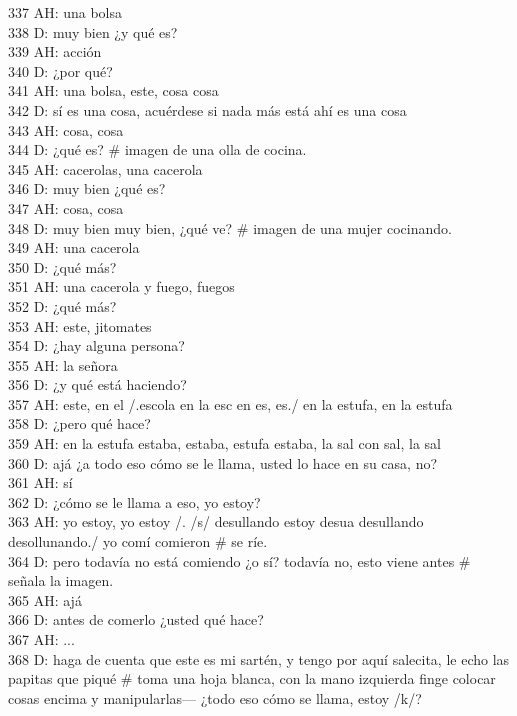 337 AH: una bolsa\\
338 D: muy bien ¿y qué es?\\
339 AH: acción\\
340 D: ¿por qué?\\
341 AH: una bolsa, este, cosa cosa\\
342 D: sí es una cosa, acuérdese si nada más está ahí es una cosa\\
343 AH: cosa, cosa\\
344 D: ¿qué es? \# imagen de una olla de cocina.\\
345 AH: cacerolas, una cacerola\\
346 D: muy bien ¿qué es?\\
347 AH: cosa, cosa\\
348 D: muy bien muy bien, ¿qué ve? \# imagen de una mujer cocinando.\\
349 AH: una cacerola\\
350 D: ¿qué más?\\
351 AH: una cacerola y fuego, fuegos\\
352 D: ¿qué más?\\
353 AH: este, jitomates\\
354 D: ¿hay alguna persona?\\
355 AH: la señora\\
356 D: ¿y qué está haciendo?\\
357 AH: este, en el /.escola en la esc en es, es./ en la estufa, en la estufa\\
358 D: ¿pero qué hace?\\
359 AH: en la estufa estaba, estaba, estufa estaba, la sal con sal, la sal\\
360 D: ajá ¿a todo eso cómo se le llama, usted lo hace en su casa, no?\\
361 AH: sí\\
362 D: ¿cómo se le llama a eso, yo estoy?\\
363 AH: yo estoy, yo estoy /. /s/ desullando estoy desua desullando desollunando./ yo comí comieron \# se ríe.\\
364 D: pero todavía no está comiendo ¿o sí? todavía no, esto viene antes \# señala la imagen.\\
365 AH: ajá\\
366 D: antes de comerlo ¿usted qué hace?\\
367 AH: ...\\
368 D: haga de cuenta que este es mi sartén, y tengo por aquí salecita, le echo las papitas que piqué \# toma una hoja blanca, con la mano izquierda finge colocar cosas encima y manipularlas--- ¿todo eso cómo se llama, estoy /k/?\\

